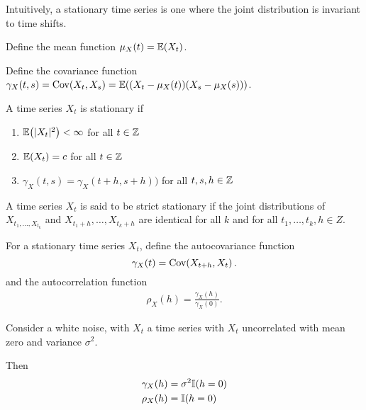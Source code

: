 Intuitively, a stationary time series is one where the joint
distribution is invariant to time shifts.

\begin{defn}
  \label{defn:time_series:7}
  Define the mean function $\mu_{X}(t) = \E{X_{t}}$.

  Define the covariance function $\gamma_{X}(t, s) = \Cov{X_{t}}{X_{s}}
    = \E{(X_{t} - \mu_{X}(t))(X_{s} - \mu_{X}(s))}$.
\end{defn}

\begin{defn}
  \label{defn:time_series:6}
  A time series $X_{t}$ is stationary if
  \begin{enumerate}
  \item $\E{|X_t|^2} < \infty$ for all $t \in \mathbb{Z}$
  \item $\E{X_{t}} = c$ for all $t \in \mathbb{Z}$
  \item $\gamma_{X}(t, s) = \gamma_{X}(t+h, s+h))$ for all $t, s, h
    \in \mathbb{Z}$
  \end{enumerate}
\end{defn}

\begin{defn}
  \label{defn:time_series:8}
  A time series $X_{t}$ is said to be strict stationary if the joint
  distributions of $X_{t_{1}, \dots, X_{t_{k}}}$ and $X_{t_{1} + h},
  \dots, X_{t_{k} + h}$ are identical for all $k$ and for all $t_{1},
  \dots, t_{k}, h \in Z$.
\end{defn}

\begin{defn}
  \label{defn:time_series:9}
  For a stationary time series $X_{t}$, define the autocovariance
  function
  \begin{equation}
    \label{eq:2}
    \gamma_{X}(t) = \Cov{X_{t+h}}{X_{t}}.
  \end{equation}
  and the autocorrelation function
  \begin{align}
    \label{eq:3}
    \rho_{X}(h) = \frac{\gamma_{X}(h)}{\gamma_{X}(0)}.
  \end{align}
\end{defn}

\begin{exmp}
  \label{defn:time_series:10}
  Consider a white noise, with $X_{t}$ a time series with $X_{t}$
  uncorrelated with mean zero and variance $\sigma^{2}$.

  Then
  \begin{align}
    \label{eq:4}
    \gamma_{X}(h) &= \sigma^{2} \I{h=0} \\
    \rho_{X}(h) &= \I{h=0}
  \end{align}
\end{exmp}

